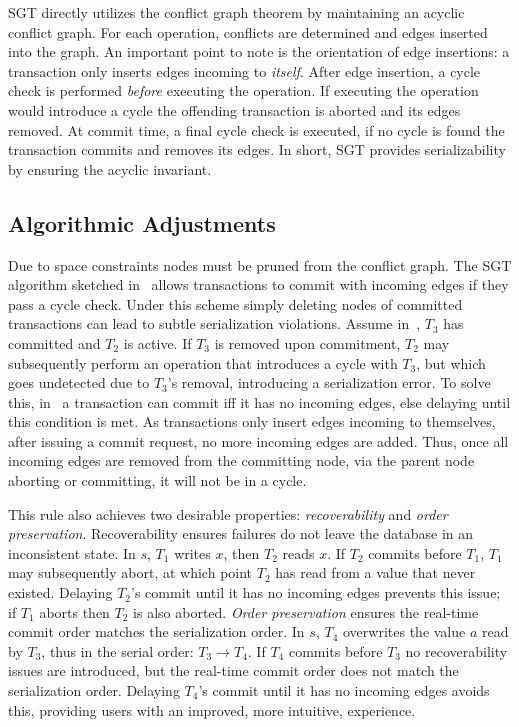 

SGT directly utilizes the conflict graph theorem by maintaining an acyclic conflict graph. 
For each operation, conflicts are determined and edges inserted into the graph. An important point 
to note is the orientation of edge insertions: a transaction only inserts edges incoming to \emph{itself}. 
After edge insertion, a cycle check is performed \emph{before} executing the operation. If 
executing the operation would introduce a cycle the offending transaction is aborted and its edges removed. At commit time, 
a final cycle check is executed, if no cycle is found the transaction commits and removes its edges. In short, 
SGT provides serializability by ensuring the acyclic invariant. 


\subsection{Algorithmic Adjustments} 
\label{sec:sgt-algo-adjust}

Due to space constraints nodes must be pruned 
from the conflict graph. The SGT algorithm 
sketched in~ allows
transactions to commit with incoming edges if 
they pass a cycle check. Under this scheme 
simply deleting nodes 
of committed transactions can lead to subtle 
serialization violations.
Assume in~, $T_3$ has 
committed and $T_2$ is active. If $T_3$ is 
removed
upon commitment, $T_2$ may subsequently perform 
an operation that introduces a cycle with $T_3$, 
but which goes undetected due to $T_3$'s removal, introducing a serialization error. To solve this, in~\cite{DBLP:conf/icde/Durner019} a transaction can commit iff it has no incoming edges, 
else delaying until this condition is met.
As transactions only insert edges incoming to themselves, after issuing a commit request, no more 
incoming edges are added. Thus, once all incoming edges are removed from the committing node, via the parent node aborting or committing,
it will not be in a cycle.

This rule also achieves two desirable properties: \emph{recoverability} and \emph{order preservation}. 
Recoverability ensures failures do not leave the database in an inconsistent state. 
In $s$, $T_1$ writes $x$, then $T_2$ reads $x$. If $T_2$ commits before $T_1$, $T_1$ may subsequently abort, at 
which point $T_2$ has read from a value that never existed. Delaying $T_2$'s commit until it has no incoming edges 
prevents this issue; if $T_1$ aborts then $T_2$ is also aborted. \emph{Order preservation} ensures the real-time commit order matches the 
serialization order. In $s$, $T_4$ overwrites the value $a$ read by $T_3$, thus
in the serial order: $T_3 \rightarrow T_4$. If $T_4$ commits before $T_3$ no recoverability issues 
are introduced, but the real-time commit order does not match the serialization order. Delaying $T_4$'s commit 
until it has no incoming edges avoids this, providing users with an improved, more intuitive, experience.

